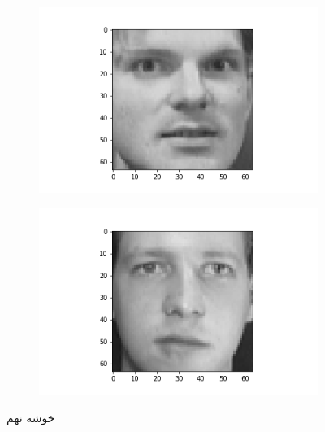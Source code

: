 \documentclass[12pt, a4paper]{article}
\begin{document}
\begin{figure}[h]
\begin{subfigure}{0.3\linewidth}
    \end{subfigure}
    \hfill
    \begin{subfigure}{0.3\linewidth}
        \centering
        \includegraphics[width=\linewidth]{images/q3/c/8/8.png}
    \end{subfigure}
    \newline
    \hfill
    \begin{subfigure}{0.3\linewidth}
        \centering
        \includegraphics[width=\linewidth]{images/q3/c/8/9.png}
    \end{subfigure}
    \caption{خوشه نهم}
\end{figure}
\end{document}
